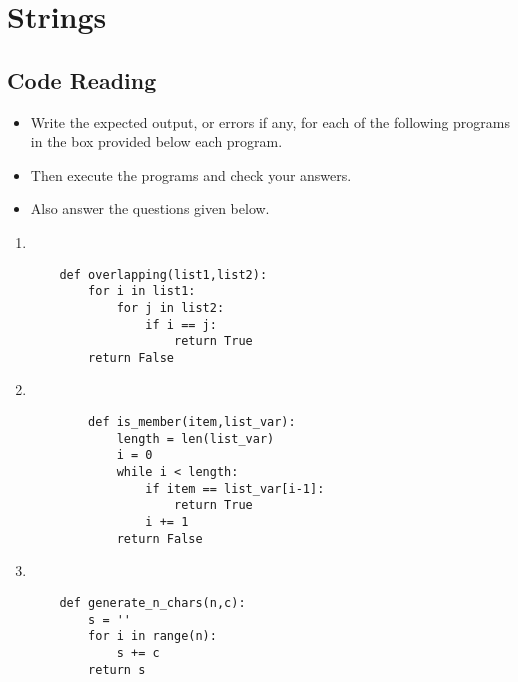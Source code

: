 \documentclass[11pt,a4paper]{article}
\def\AnswerBox{\fbox{\begin{minipage}{4in}\hfill\vspace{0.5in}\end{minipage}}}
\begin{document}
\section*{Strings}

\subsection*{Code Reading}
\begin{itemize}
    \item Write the expected output, or errors if any, for each of the following programs in the box provided below each program.
    \item Then execute the programs and check your answers.
    \item Also answer the questions given below.
\end{itemize}
\begin{enumerate}[label=\bfseries Program \arabic*:]
    \item ~
    \begin{lstlisting}
    def overlapping(list1,list2):
        for i in list1:
            for j in list2:
                if i == j:
                    return True
        return False
    \end{lstlisting}
    \AnswerBox
    \item  ~
    \begin{lstlisting}
        def is_member(item,list_var):
            length = len(list_var)
            i = 0
            while i < length:
                if item == list_var[i-1]:
                    return True
                i += 1
            return False
    \end{lstlisting}
    \AnswerBox
    \item ~
    \begin{lstlisting}
    def generate_n_chars(n,c):
        s = ''
        for i in range(n):
            s += c
        return s
    \end{lstlisting}
    \AnswerBox
\end{enumerate}
\end{document}
